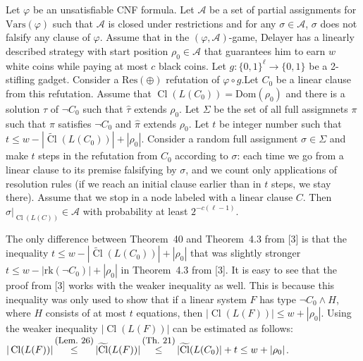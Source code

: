 Let $\varphi$ be an unsatisfiable CNF formula. Let $\mathcal{A}$ be a set of partial assignments for $\mathrm{Vars}(\varphi)$ such that $\mathcal{A}$ is closed under restrictions and for any $\sigma\in\mathcal{A}$, $\sigma$ does not falsify any clause of $\varphi$.
Assume that in the $(\varphi,\mathcal{A})$-game, Delayer has a linearly described strategy with start position $\rho_{0}\in\mathcal{A}$ that guarantees him to earn $w$ white coins while paying at most $c$ black coins. Let $g\colon\{0,1\}^{\ell}\to\{0,1\}$ be a 2-stifling gadget.
Consider a $\mathrm{Res}(\oplus)$ refutation of $\varphi\circ g$.Let $C_{0}$ be a linear clause from this refutation. Assume that $\mathop{\mathrm{Cl}}(L(C_{0}))=\mathrm{Dom}(\rho_{0})$ and there is a solution $\tau$ of $\lnot C_{0}$ such that $\hat{\tau}$ extends $\rho_{0}$.
Let $\Sigma$ be the set of all full assigmnets $\pi$ such that $\pi$ satisfies $\lnot C_{0}$ and $\hat{\pi}$ extends $\rho_{0}$. Let $t$ be integer number such that $t\leq w-|\widetilde{\mathop{\mathrm{Cl}}}(L(C_{0}))|+|\rho_{0}|$. Consider a random full assignment $\sigma\in\Sigma$
and make $t$ steps in the refutation from $C_{0}$ according to $\sigma$: each time we go from a linear clause to its premise falsifying by $\sigma$, and we count only applications of resolution rules (if we reach an initial clause earlier than in $t$ steps, we stay there). Assume that we stop in a node labeled with a linear clause $C$. Then $\hat{\sigma}|_{\mathop{\mathrm{Cl}}(L(C))}\in\mathcal{A}$ with probability at least
$2^{-c(\ell-1)}$.\par




The only difference between Theorem 40 and Theorem 4.3 from [3] is that the inequality $t\leq w-|\widetilde{\mathop{\mathrm{Cl}}}(L(C_{0}))|+|\rho_{0}|$ that was slightly stronger $t\leq w-|\mathrm{rk}(\lnot C_{0})|+|\rho_{0}|$ in Theorem 4.3 from [3]. It is easy to see that the proof from [3] works with the weaker inequality as well. This is because this inequality was only used to show that if a linear system $F$ has type $\lnot C_{0}\land H$, where $H$ consists of at most $t$ equations, then $|\mathop{\mathrm{Cl}}(L(F))|\leq w+|\rho_{0}|$. Using the weaker inequality $|\mathop{\mathrm{Cl}}(L(F))|$ can be estimated as follows:
$|\mathop{\mathrm{Cl}}(L(F))|\mathop{\leq}\limits^{\mbox{\small(Lem.\leavevmode\nobreak\ 26)}}|\widetilde{\mathop{\mathrm{Cl}}}(L(F))|\mathop{\leq}\limits^{\mbox{\small(Th.\leavevmode\nobreak\ 21)}}|\widetilde{\mathop{\mathrm{Cl}}}(L(C_{0})|+t\leq w+|\rho_{0}|$.\par


